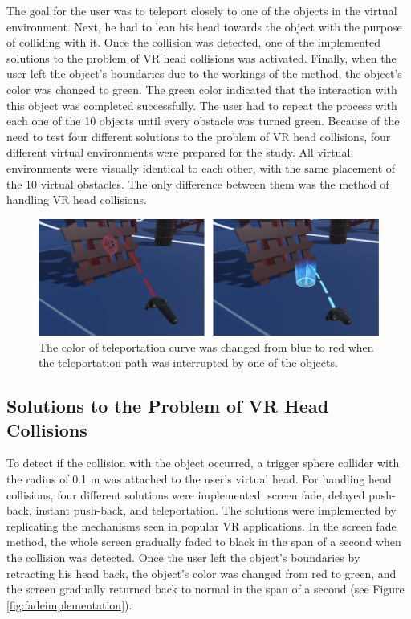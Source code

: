 The goal for the user was to teleport closely to one of the objects in the virtual environment. Next, he had to lean his head towards the object with the purpose of colliding with it. Once the collision was detected, one of the implemented solutions to the problem of VR head collisions was activated. Finally, when the user left the object's boundaries due to the workings of the method, the object's color was changed to green. The green color indicated that the interaction with this object was completed successfully. The user had to repeat the process with each one of the 10 objects until every obstacle was turned green. Because of the need to test four different solutions to the problem of VR head collisions, four different  virtual environments were prepared for the study. All virtual environments were visually identical to each other, with the same placement of the 10 virtual obstacles. The only difference between them was the method of handling VR head collisions.

\begin{figure}[th]
\centering
\includegraphics[width=1\textwidth]{img/implemented_teleportation.png}
\caption{The color of teleportation curve was changed from blue to red when the teleportation path was interrupted by one of the objects.}
\label{fig:tpimplementation}
\end{figure}

\subsection{Solutions to the Problem of VR Head Collisions}

To detect if the collision with the object occurred, a trigger sphere collider \cite{SPHERECOLLIDER} with the radius of 0.1 m was attached to the user's virtual head. For handling head collisions, four different solutions were implemented: screen fade, delayed push-back, instant push-back, and teleportation. The solutions were implemented by replicating the mechanisms seen in popular VR applications. In the screen fade method, the whole screen gradually faded to black in the span of a second when the collision was detected. Once the user left the object's boundaries by retracting his head back, the object's color was changed from red to green, and the screen gradually returned back to normal in the span of a second (see Figure \ref{fig:fadeimplementation}). 

